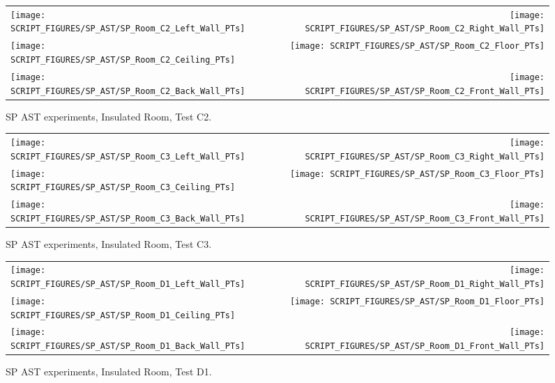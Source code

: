 \begin{figure}[p]
\begin{tabular*}{\textwidth}{l@{\extracolsep{\fill}}r}
\texttt{[image: SCRIPT\_FIGURES/SP\_AST/SP\_Room\_C2\_Left\_Wall\_PTs]} &  \texttt{[image: SCRIPT\_FIGURES/SP\_AST/SP\_Room\_C2\_Right\_Wall\_PTs]}  \\
\texttt{[image: SCRIPT\_FIGURES/SP\_AST/SP\_Room\_C2\_Ceiling\_PTs]}   &  \texttt{[image: SCRIPT\_FIGURES/SP\_AST/SP\_Room\_C2\_Floor\_PTs]}  \\
\texttt{[image: SCRIPT\_FIGURES/SP\_AST/SP\_Room\_C2\_Back\_Wall\_PTs]} &  \texttt{[image: SCRIPT\_FIGURES/SP\_AST/SP\_Room\_C2\_Front\_Wall\_PTs]}
\end{tabular*}
\caption[SP AST experiments, Insulated Room, Test C2]{SP AST experiments, Insulated Room, Test C2.}
\label{SP_Room_C2_PTs}
\end{figure}

\begin{figure}[p]
\begin{tabular*}{\textwidth}{l@{\extracolsep{\fill}}r}
\texttt{[image: SCRIPT\_FIGURES/SP\_AST/SP\_Room\_C3\_Left\_Wall\_PTs]} &  \texttt{[image: SCRIPT\_FIGURES/SP\_AST/SP\_Room\_C3\_Right\_Wall\_PTs]}  \\
\texttt{[image: SCRIPT\_FIGURES/SP\_AST/SP\_Room\_C3\_Ceiling\_PTs]}   &  \texttt{[image: SCRIPT\_FIGURES/SP\_AST/SP\_Room\_C3\_Floor\_PTs]}  \\
\texttt{[image: SCRIPT\_FIGURES/SP\_AST/SP\_Room\_C3\_Back\_Wall\_PTs]} &  \texttt{[image: SCRIPT\_FIGURES/SP\_AST/SP\_Room\_C3\_Front\_Wall\_PTs]}
\end{tabular*}
\caption[SP AST experiments, Insulated Room, Test C3]{SP AST experiments, Insulated Room, Test C3.}
\label{SP_Room_C3_PTs}
\end{figure}

\begin{figure}[p]
\begin{tabular*}{\textwidth}{l@{\extracolsep{\fill}}r}
\texttt{[image: SCRIPT\_FIGURES/SP\_AST/SP\_Room\_D1\_Left\_Wall\_PTs]} &  \texttt{[image: SCRIPT\_FIGURES/SP\_AST/SP\_Room\_D1\_Right\_Wall\_PTs]}  \\
\texttt{[image: SCRIPT\_FIGURES/SP\_AST/SP\_Room\_D1\_Ceiling\_PTs]}   &  \texttt{[image: SCRIPT\_FIGURES/SP\_AST/SP\_Room\_D1\_Floor\_PTs]}  \\
\texttt{[image: SCRIPT\_FIGURES/SP\_AST/SP\_Room\_D1\_Back\_Wall\_PTs]} &  \texttt{[image: SCRIPT\_FIGURES/SP\_AST/SP\_Room\_D1\_Front\_Wall\_PTs]}
\end{tabular*}
\caption[SP AST experiments, Insulated Room, Test D1]{SP AST experiments, Insulated Room, Test D1.}
\label{SP_Room_D1_PTs}
\end{figure}

